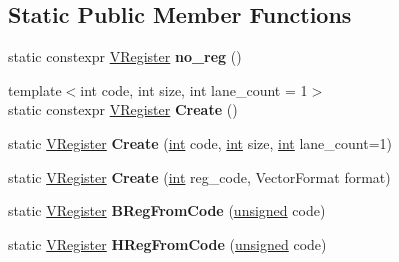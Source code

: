 \subsection*{Static Public Member Functions}
\begin{DoxyCompactItemize}
\item 
\mbox{\label{classv8_1_1internal_1_1VRegister_a3c938151335ff7180191f1b8be8e6647}} 
static constexpr \mbox{\hyperlink{classv8_1_1internal_1_1VRegister}{V\+Register}} {\bfseries no\+\_\+reg} ()
\item 
\mbox{\label{classv8_1_1internal_1_1VRegister_a15edab6df5874c408daedd3a806f2b0d}} 
{\footnotesize template$<$int code, int size, int lane\+\_\+count = 1$>$ }\\static constexpr \mbox{\hyperlink{classv8_1_1internal_1_1VRegister}{V\+Register}} {\bfseries Create} ()
\item 
\mbox{\label{classv8_1_1internal_1_1VRegister_a4df5302e4e37bded51b01d89201548af}} 
static \mbox{\hyperlink{classv8_1_1internal_1_1VRegister}{V\+Register}} {\bfseries Create} (\mbox{\hyperlink{classint}{int}} code, \mbox{\hyperlink{classint}{int}} size, \mbox{\hyperlink{classint}{int}} lane\+\_\+count=1)
\item 
\mbox{\label{classv8_1_1internal_1_1VRegister_ab1b41b6a908a34f244d779fe54d6a895}} 
static \mbox{\hyperlink{classv8_1_1internal_1_1VRegister}{V\+Register}} {\bfseries Create} (\mbox{\hyperlink{classint}{int}} reg\+\_\+code, Vector\+Format format)
\item 
\mbox{\label{classv8_1_1internal_1_1VRegister_a8348f13c376e1e355d5640ccf64fd7cb}} 
static \mbox{\hyperlink{classv8_1_1internal_1_1VRegister}{V\+Register}} {\bfseries B\+Reg\+From\+Code} (\mbox{\hyperlink{classunsigned}{unsigned}} code)
\item 
\mbox{\label{classv8_1_1internal_1_1VRegister_a278098439081bdcb0c384061584546f3}} 
static \mbox{\hyperlink{classv8_1_1internal_1_1VRegister}{V\+Register}} {\bfseries H\+Reg\+From\+Code} (\mbox{\hyperlink{classunsigned}{unsigned}} code)
\item 
\mbox{\label{classv8_1_1internal_1_1VRegister_ad1413f8cbdce9b841619ac6121ba5d79}} 

\end{DoxyCompactItemize}
